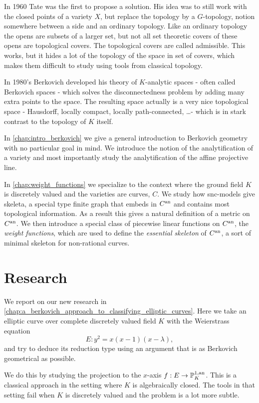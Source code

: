 In 1960 Tate was the first to propose a solution. 
His idea was to still work with the closed points of a variety $X$, but replace the topology by a $G$-topology, notion somewhere between a side and an ordinary topology. 
Like an ordinary topology the opens are subsets of a larger set, but not all set theoretic covers of these opens are topological covers. 
The topological covers are called admissible.
This works, but it hides a lot of the topology of the space in set of covers, which makes them difficult to study using tools from classical topology.

In 1980's Berkovich developed his theory of $K$-analytic spaces - often called Berkovich spaces - which solves the disconnectedness problem by adding many extra points to the space. 
The resulting space actually is a very nice topological space - Hausdorff, locally compact, locally path-connected, \ldots - which is in stark contrast to the topology of $K$ itself.  

\medskip 
In \cref{chap:intro_berkovich} we give a general introduction to Berkovich geometry with no particular goal in mind. 
We introduce the notion of the analytification of a variety and most importantly study the analytification of the affine projective line. 
 
In \cref{chap:weight_functions} we specialize to the context where the ground field $K$ is discretely valued and the varieties are curves, $C$.  
We study how snc-models give skeleta, a special type finite graph that embeds in $C{}^{\text{an}}$ and contains most topological information. 
As a result this gives a natural definition of a metric on $C{}^{\text{an}}$. 
We then introduce a special class of piecewise linear functions on $C{}^{\text{an}}$, the \emph{weight functions}, which are used to define the \emph{essential skeleton} of $C{}^{\text{an}}$, a sort of minimal skeleton for non-rational curves. 


\section{Research} \label{sec:research}

We report on our new research in \cref{chap:a_berkovich_approach_to_classifying_elliptic_curves}. 
Here we take  an elliptic curve over complete discretely valued field $K$ with the Weierstrass equation \[
	E: y^2 = x(x-1)(x-\lambda)
,\] 
and try to deduce its reduction type using an argument that is as Berkovich geometrical as possible. 

We do this by studying the projection to the $x$-axis $f: E\to \mathbb{P}^{1, \text{an}}_K$.
This is a classical approach in the setting where $K$ is algebraically closed. 
The tools in that setting fail when $K$ is discretely valued and the problem is a lot more subtle. 

